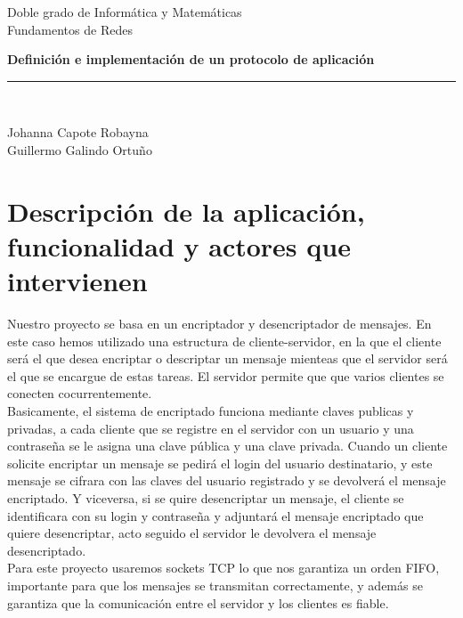 \documentclass[11pt]{article}
\begin{document}
\begin{titlepage}

\begin{center}
Doble grado de Inform\'atica y Matem\'aticas\\
\vspace*{0.15in}
Fundamentos de Redes \\
\vspace*{2in}
\vspace*{0.2in}
\begin{LARGE}
\textbf{Definici\'on e implementación de un protocolo de aplicaci\'on} \\
\end{LARGE}
\rule{80mm}{0.1mm}\\
\vspace*{0.1in}
\begin{large}
Johanna Capote Robayna\\
Guillermo Galindo Ortuño \\
\end{large}
\end{center}

\end{titlepage}
\newpage
\section{Descripci\'on de la aplicaci\'on, funcionalidad y actores que intervienen}
Nuestro proyecto se basa en un encriptador y desencriptador de mensajes. En este caso hemos utilizado una estructura de cliente-servidor, en la que el cliente ser\'a el que desea encriptar o descriptar un mensaje mienteas que el servidor ser\'a el que se encargue de estas tareas. El servidor permite que que varios clientes se conecten cocurrentemente.\\
Basicamente, el sistema de encriptado funciona mediante claves publicas y privadas, a cada cliente que se registre en el servidor con un usuario y una contraseña se le asigna una clave p\'ublica y una clave privada. Cuando un cliente solicite encriptar un mensaje se pedir\'a el login del usuario destinatario, y este mensaje se cifrara con las claves del usuario registrado y se devolver\'a el mensaje encriptado. Y viceversa, si se quire desencriptar un mensaje, el cliente se identificara con su login y contraseña y adjuntar\'a el mensaje encriptado que quiere desencriptar, acto seguido el servidor le devolvera el mensaje desencriptado.\\
Para este proyecto usaremos sockets TCP lo que nos garantiza un orden FIFO, importante para que los mensajes se transmitan correctamente, y adem\'as se garantiza que la comunicaci\'on entre el servidor y los clientes es fiable.
\newpage
\end{document}
